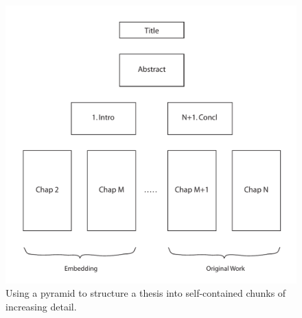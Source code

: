 \begin{figure}[tp]
\centering
\includegraphics[keepaspectratio,width=\linewidth,height=\halfh]
{diagrams/pyramid.pdf}

\caption[Pyramid Writing Structure]{
Using a pyramid to structure a thesis into self-contained chunks
of increasing detail.
}
\label{fig:Pyramid}
\end{figure}


